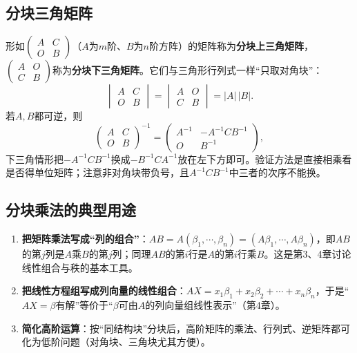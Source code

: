 
\subsection{分块三角矩阵}

形如$\begin{pmatrix}A&C\\O&B\end{pmatrix}$（$A$为$m$阶、$B$为$n$阶方阵）的矩阵称为\textbf{分块上三角矩阵}，$\begin{pmatrix}A&O\\C&B\end{pmatrix}$称为\textbf{分块下三角矩阵}。它们与三角形行列式一样“只取对角块”：
\[
\begin{vmatrix}A&C\\O&B\end{vmatrix}=\begin{vmatrix}A&O\\C&B\end{vmatrix}=|A|\,|B|.
\]
若$A,B$都可逆，则
\[
\begin{pmatrix}A&C\\O&B\end{pmatrix}^{-1}=\begin{pmatrix}A^{-1}&-A^{-1}CB^{-1}\\O&B^{-1}\end{pmatrix},
\]
下三角情形把$-A^{-1}CB^{-1}$换成$-B^{-1}CA^{-1}$放在左下方即可。验证方法是直接相乘看是否得单位矩阵；注意非对角块带负号，且$A^{-1}CB^{-1}$中三者的次序不能换。

\subsection{分块乘法的典型用途}

\begin{enumerate}
\item \textbf{把矩阵乘法写成“列的组合”}：$AB=A(\beta_1,\cdots,\beta_n)=(A\beta_1,\cdots,A\beta_n)$，即$AB$的第$j$列是$A$乘$B$的第$j$列；同理$AB$的第$i$行是$A$的第$i$行乘$B$。这是第3、4章讨论线性组合与秩的基本工具。
\item \textbf{把线性方程组写成列向量的线性组合}：$AX=x_1\beta_1+x_2\beta_2+\cdots+x_n\beta_n$，于是“$AX=\beta$有解”等价于“$\beta$可由$A$的列向量组线性表示”（第4章）。
\item \textbf{简化高阶运算}：按“同结构块”分块后，高阶矩阵的乘法、行列式、逆矩阵都可化为低阶问题（对角块、三角块尤其方便）。
\end{enumerate}

